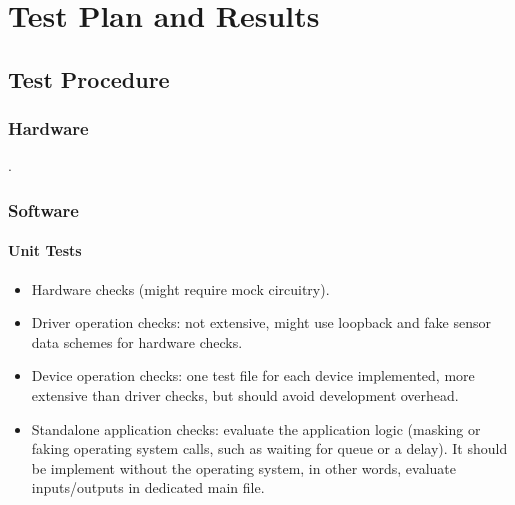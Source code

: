%
%
%
%
%

%
%
%
%
%
%

\chapter{Test Plan and Results} \label{ch:test-plan}

\section{Test Procedure}

\subsection{Hardware}

.

\subsection{Software}

\subsubsection{Unit Tests}

\begin{itemize}
    \item Hardware checks (might require mock circuitry).
    \item Driver operation checks: not extensive, might use loopback and fake sensor data schemes for hardware checks.
    \item Device operation checks: one test file for each device implemented, more extensive than driver checks, but should avoid development overhead.
    \item Standalone application checks: evaluate the application logic (masking or faking operating system calls, such as waiting for queue or a delay). It should be implement without the operating system, in other words, evaluate inputs/outputs in dedicated main file.
\end{itemize}

